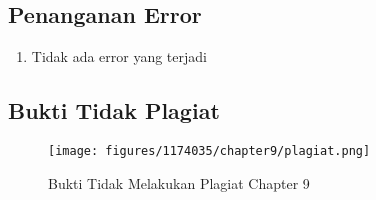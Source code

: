 \subsection{Penanganan Error}
\begin{enumerate}
	\item Tidak ada error yang terjadi
\end{enumerate}

\subsection{Bukti Tidak Plagiat}
\begin{figure}[H]
\centering
	\texttt{[image: figures/1174035/chapter9/plagiat.png]}
	\caption{Bukti Tidak Melakukan Plagiat Chapter 9}
\end{figure}